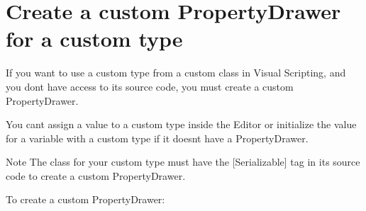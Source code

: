 \chapter{Create a custom Property\+Drawer for a custom type}
\hypertarget{md__hey_tea_9_2_library_2_package_cache_2com_8unity_8visualscripting_0d1_88_80_2_documentation_0i_2vs-create-custom-drawer}{}\label{md__hey_tea_9_2_library_2_package_cache_2com_8unity_8visualscripting_0d1_88_80_2_documentation_0i_2vs-create-custom-drawer}
\label{md__hey_tea_9_2_library_2_package_cache_2com_8unity_8visualscripting_0d1_88_80_2_documentation_0i_2vs-create-custom-drawer_autotoc_md5231}%
%
 If you want to use a custom type from a custom class in Visual Scripting, and you don\textquotesingle{}t have access to its source code, you must create a custom Property\+Drawer.

You can\textquotesingle{}t assign a value to a custom type inside the Editor or initialize the value for a variable with a custom type if it doesn\textquotesingle{}t have a Property\+Drawer.

\begin{DoxyNote}{Note}
The class for your custom type must have the {\ttfamily \mbox{[}Serializable\mbox{]}} tag in its source code to create a custom Property\+Drawer.
\end{DoxyNote}
To create a custom Property\+Drawer\+:


